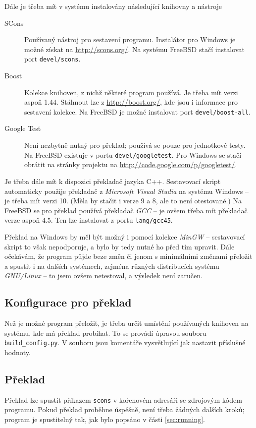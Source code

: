 \documentclass{article}
\begin{document}
Dále je třeba mít v systému instalovány následující knihovny a nástroje\begin{description}
\item[SCons] Používaný nástroj pro sestavení programu. Instalátor pro Windows je možné získat na
\url{http://scons.org/}. Na systému FreeBSD stačí instalovat port \texttt{devel/scons}.
\item[Boost] Kolekce knihoven, z nichž některé program používá. Je třeba mít verzi aspoň 1.44. Stáhnout lze z
\url{http://boost.org/}, kde jsou i informace pro sestavení kolekce. Na FreeBSD je možné instalovat port
\texttt{devel/boost-all}.
\item[Google Test] Není nezbytně nutný pro překlad; používá se pouze pro jednotkové testy. Na FreeBSD existuje v portu
\texttt{devel/googletest}. Pro Windows se stačí obrátit na stránky projektu na
\url{http://code.google.com/p/googletest/}.
\end{description}

Je třeba dále mít k dispozici překladač jazyka C++. Sestavovací skript automaticky použije překladač z \emph{Microsoft
Visual Studia} na systému Windows -- je třeba mít verzi 10. (Měla by stačit i verze 9 a 8, ale to není otestované.) Na
FreeBSD se pro překlad používá překladač \emph{GCC} -- je ovšem třeba mít překladač verze aspoň 4.5. Ten lze instalovat
z portu \texttt{lang/gcc45}.

Překlad na Windows by měl být možný i pomocí kolekce \emph{MinGW} -- sestavovací skript to však nepodporuje, a bylo by
tedy nutné ho před tím upravit. Dále očekávám, že program půjde beze změn či jenom s minimálními změnami přeložit a
spustit i na dalších systémech, zejména různých distribucích systému \emph{GNU/Linux} -- to jsem ovšem netestoval, a
výsledek není zaručen.

\subsection{Konfigurace pro překlad}
Než je možné program přeložit, je třeba určit umístění používaných knihoven na systému, kde má překlad probíhat. To se
provádí úpravou souboru \texttt{build\_config.py}. V souboru jsou komentáře vysvětlující jak nastavit příslušné hodnoty.

\subsection{Překlad}
Překlad lze spustit příkazem \verb+scons+ v kořenovém adresáři se zdrojovým kódem programu. Pokud překlad proběhne
úspěšně, není třeba žádných dalších kroků; program je spustitelný tak, jak bylo popsáno v části \ref{sec:running}.
\end{document}
